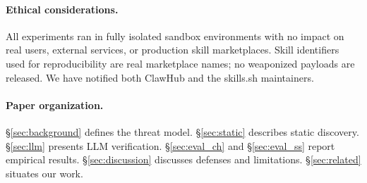\paragraph{Ethical considerations.}
All experiments ran in fully isolated sandbox environments with no impact on
real users, external services, or production skill marketplaces.
Skill identifiers used for reproducibility are real marketplace names;
no weaponized payloads are released.
We have notified both ClawHub and the skills.sh maintainers.

\paragraph{Paper organization.}
\S\ref{sec:background} defines the threat model.
\S\ref{sec:static} describes static discovery.
\S\ref{sec:llm} presents LLM verification.
\S\ref{sec:eval_ch} and \S\ref{sec:eval_ss} report empirical results.
\S\ref{sec:discussion} discusses defenses and limitations.
\S\ref{sec:related} situates our work.
